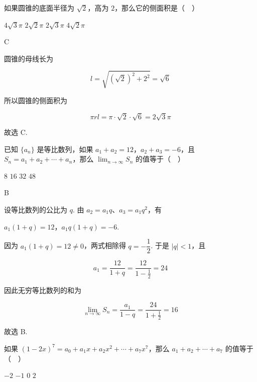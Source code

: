 \documentclass[UTF8,a4paper,oneside,11pt]{ctexbook}
\begin{document}
\begin{problem}
如果圆锥的底面半径为 \(\sqrt{2}\)，高为 \(2\)，那么它的侧面积是（\(\quad\)）

\choices
    {\(4\sqrt{3}\pi\)}
    {\(2\sqrt{2}\pi\)}
    {\(2\sqrt{3}\pi\)}
    {\(4\sqrt{2}\pi\)}
\end{problem}

\begin{answer}
C
\end{answer}

\begin{solution}
圆锥的母线长为

\[l=\sqrt{\left(\sqrt{2}\right)^2+2^2}=\sqrt{6}\]

所以圆锥的侧面积为

\[\pi rl=\pi\cdot\sqrt{2}\cdot\sqrt{6}=2\sqrt{3}\pi\]

故选 C.
\end{solution}

\begin{problem}
已知 \(\{a_n\}\) 是等比数列，如果 \(a_1 + a_2 = 12\)，\(a_2 + a_3 = -6\)，且 \(S_n = a_1 + a_2 + \cdots + a_n\)，那么 \(\displaystyle\lim_{n \to \infty} S_n\) 的值等于（\(\quad\)）

\choices
    {\(8\)}
    {\(16\)}
    {\(32\)}
    {\(48\)}
\end{problem}

\begin{answer}
B
\end{answer}

\begin{solution}
设等比数列的公比为 \(q\). 由 \(a_2=a_1q\)、\(a_3=a_1q^2\)，有

\(a_1(1+q)=12\)，\(a_1q(1+q)=-6\).

因为 \(a_1(1+q)=12\neq0\)，两式相除得 \(q=-\dfrac12\). 于是 \(|q|<1\)，且

\[a_1=\frac{12}{1+q}=\frac{12}{1-\frac12}=24\]

因此无穷等比数列的和为

\[\lim_{n\to\infty}S_n=\frac{a_1}{1-q}=\frac{24}{1+\frac12}=16\]

故选 B.
\end{solution}

\begin{problem}
如果 \((1 - 2x)^7 = a_0 + a_1x + a_2x^2 + \cdots + a_7x^7\)，那么 \(a_1 + a_2 + \cdots + a_7\) 的值等于（\(\quad\)）

\choices
    {\(-2\)}
    {\(-1\)}
    {\(0\)}
    {\(2\)}
\end{problem}
\end{document}
